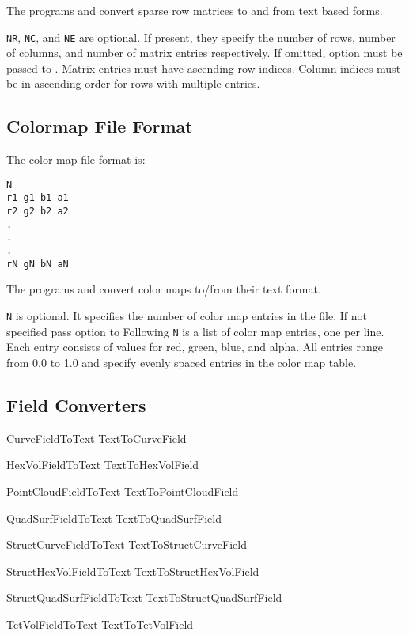 The programs  and
 convert sparse row matrices to and from
text based forms.

\verb|NR|, \verb|NC|, and \verb|NE| are optional.  If present, they
specify the number of rows, number of columns, and number of matrix
entries respectively.  If omitted, option  must be passed to .
Matrix entries must have ascending row indices. Column indices must be
in ascending order for rows with multiple entries.

\subsection{Colormap File Format}
\label{sec:colormap_fmt}

The color map file format is:

\begin{verbatim}
N
r1 g1 b1 a1
r2 g2 b2 a2
.
.
.
rN gN bN aN
\end{verbatim}

The programs  and 
convert color maps to/from their text format.

\verb|N| is optional.  It specifies the number of color map entries in
the file.  If not specified pass option  to
  Following \verb|N| is a list of color map
entries, one per line.  Each entry consists of values for red, green,
blue, and alpha.  All entries range from 0.0 to 1.0 and specify 
evenly spaced entries in the color map table.


\subsection{Field Converters}

CurveFieldToText
TextToCurveField

HexVolFieldToText
TextToHexVolField

PointCloudFieldToText
TextToPointCloudField

QuadSurfFieldToText
TextToQuadSurfField

StructCurveFieldToText
TextToStructCurveField

StructHexVolFieldToText
TextToStructHexVolField

StructQuadSurfFieldToText
TextToStructQuadSurfField

TetVolFieldToText
TextToTetVolField

